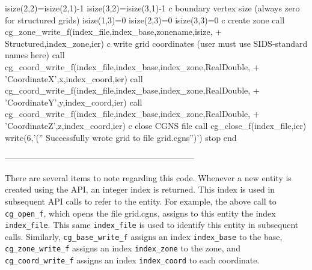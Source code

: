 \documentclass[12pt]{article}
\begin{document}
{\newline\indent      isize(2,2)=isize(2,1)-1
\newline\indent      isize(3,2)=isize(3,1)-1
\newline c  boundary vertex size (always zero for structured grids)
\newline\indent      isize(1,3)=0
\newline\indent      isize(2,3)=0
\newline\indent      isize(3,3)=0
\newline c  create zone
\newline\indent      call cg\_zone\_write\_f(index\_file,index\_base,zonename,isize,
\newline + \indent Structured,index\_zone,ier)
\newline c  write grid coordinates (user must use SIDS-standard names here)
\newline\indent      call cg\_coord\_write\_f(index\_file,index\_base,index\_zone,RealDouble,
\newline + \indent 'CoordinateX',x,index\_coord,ier)
\newline\indent      call cg\_coord\_write\_f(index\_file,index\_base,index\_zone,RealDouble,
\newline + \indent 'CoordinateY',y,index\_coord,ier)
\newline\indent      call cg\_coord\_write\_f(index\_file,index\_base,index\_zone,RealDouble,
\newline + \indent 'CoordinateZ',z,index\_coord,ier)
\newline c  close CGNS file
\newline\indent      call cg\_close\_f(index\_file,ier)
\newline\indent      write(6,'('' Successfully wrote grid to file grid.cgns'')')
\newline\indent      stop
\newline\indent      end
}

--------------------------------------------------------------------

\noindent There are several items to note regarding this
code.  Whenever a new entity is created using the API,
an integer index is returned.  This index is used in subsequent
API calls to refer to the entity.  For example, the above call to
{\tt cg\_open\_f}, which opens the file grid.cgns, assigns to this
entity the index {\tt index\_file}.  This same {\tt index\_file}
is used to identify this entity in subsequent calls.
Similarly, {\tt cg\_base\_write\_f} assigns an index {\tt index\_base} to
the base, {\tt cg\_zone\_write\_f} 
assigns an index {\tt index\_zone} to the zone, and
{\tt cg\_coord\_write\_f} assigns an index {\tt index\_coord}
to each coordinate.
\end{document}
